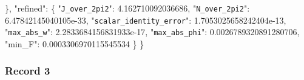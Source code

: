 \documentclass[
  10pt,
]{article}
\newenvironment{Shaded}{}{}
\newcommand{\DataTypeTok}[1]{\textcolor[rgb]{0.56,0.13,0.00}{#1}}
\newcommand{\FloatTok}[1]{\textcolor[rgb]{0.25,0.63,0.44}{#1}}
\newcommand{\FunctionTok}[1]{\textcolor[rgb]{0.02,0.16,0.49}{#1}}
\begin{document}
\begin{Shaded}
\begin{Highlighting}[]
  \FunctionTok{\},}
  \DataTypeTok{"refined"}\FunctionTok{:} \FunctionTok{\{}
    \DataTypeTok{"\nolinkurl{J_over_2pi2}"}\FunctionTok{:} \FloatTok{4.162710092036686}\FunctionTok{,}
    \DataTypeTok{"\nolinkurl{N_over_2pi2}"}\FunctionTok{:} \FloatTok{6.47842145040105e{-}33}\FunctionTok{,}
    \DataTypeTok{"\nolinkurl{scalar_identity_error}"}\FunctionTok{:} \FloatTok{1.7053025658242404e{-}13}\FunctionTok{,}
    \DataTypeTok{"\nolinkurl{max_abs_w}"}\FunctionTok{:} \FloatTok{2.2833684156831933e{-}17}\FunctionTok{,}
    \DataTypeTok{"\nolinkurl{max_abs_phi}"}\FunctionTok{:} \FloatTok{0.0026789320891280706}\FunctionTok{,}
    \DataTypeTok{"min\_F"}\FunctionTok{:} \FloatTok{0.0003306970115545534}
  \FunctionTok{\}}
\FunctionTok{\}}
\end{Highlighting}
\end{Shaded}

\hypertarget{record-3-1}{%
\subsubsection{Record 3}\label{record-3-1}}
\end{document}
